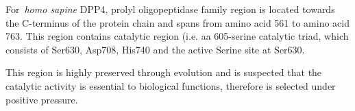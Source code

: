 For~\textit{homo sapine} DPP4, prolyl oligopeptidase family region is located towards the C-terminus of the protein chain and spans from amino acid 561 to amino acid 763. This region contains catalytic region (i.e. aa 605-serine catalytic triad, which consists of Ser630, Asp708, His740 and the active Serine site at Ser630. \par
This region is highly preserved through evolution and is suspected that the catalytic activity is essential to biological functions, therefore is selected under positive pressure. 